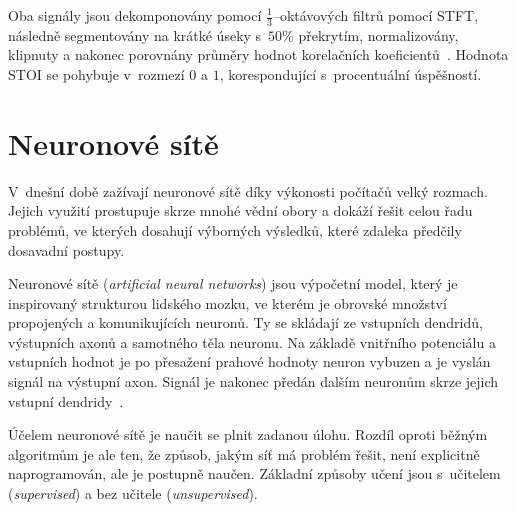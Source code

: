 Oba signály jsou dekomponovány pomocí $\frac{1}{3}$--oktávových filtrů pomocí STFT, následně segmentovány na krátké úseky s~$50\%$ překrytím, normalizovány, klipnuty a nakonec porovnány průměry hodnot korelačních koeficientů~\cite{taal-stoi}. Hodnota STOI se pohybuje v~rozmezí $0$ a $1$, korespondující s~procentuální úspěšností.





\chapter{Neuronové sítě}
\label{neuronovky}
V~dnešní době zažívají neuronové sítě díky výkonosti počítačů velký rozmach. Jejich využití prostupuje skrze mnohé vědní obory a dokáží řešit celou řadu problémů, ve kterých dosahují výborných výsledků, které zdaleka předčily dosavadní postupy. 

Neuronové sítě (\textit{artificial neural networks}) jsou výpočetní model, který je inspirovaný strukturou lidského mozku, ve kterém je obrovské množství propojených a komunikujících neuronů. Ty se skládají ze vstupních dendridů, výstupních axonů a samotného těla neuronu. Na základě vnitřního potenciálu a vstupních hodnot je po přesažení prahové hodnoty neuron vybuzen a je vyslán signál na výstupní axon. Signál je nakonec předán dalším neuronům skrze jejich vstupní dendridy~\cite{mitdeeplearning_small}.

Účelem neuronové sítě je naučit se plnit zadanou úlohu. Rozdíl oproti běžným algoritmům je ale ten, že způsob, jakým síť má problém řešit, není explicitně naprogramován, ale je postupně naučen. Základní způsoby učení jsou s~učitelem (\textit{supervised}) a bez učitele (\textit{unsupervised}). 

